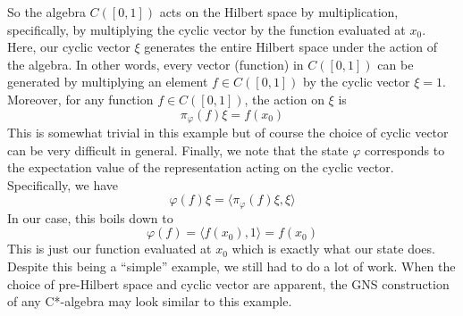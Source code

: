 \begin{example}
\begin{equation}
\end{equation}
So the algebra $C([0,1])$ acts on the Hilbert space by multiplication, specifically,
by multiplying the cyclic vector by the function evaluated at $x_0$. Here, our cyclic
vector $\xi$ generates the entire Hilbert space under the action of the algebra.
In other words, every vector (function) in $C([0,1])$ can be generated by multiplying
an element $f \in C([0,1])$ by the cyclic vector $\xi = 1$. Moreover, for
any function $f \in C([0,1])$, the action on $\xi$ is
\begin{equation}
    \pi_\varphi(f)\xi = f(x_0)
\end{equation}
This is somewhat trivial in this example but of course the choice of cyclic vector
can be very difficult in general. Finally, we note that the state  $\varphi$ corresponds
 to the expectation value of the representation acting on the cyclic vector.
Specifically, we have
\begin{equation}
    \varphi(f)\xi = \langle \pi_\varphi (f) \xi, \xi \rangle
\end{equation}
In our case, this boils down to
\begin{equation}
    \varphi(f) = \langle f(x_0), 1 \rangle = f(x_0)
\end{equation}
This is just our function evaluated at $x_0$ which is exactly what our state does.
Despite this being a ``simple'' example, we still had to do a lot of work. When
the choice of pre-Hilbert space and cyclic vector are apparent, the GNS construction
of any C*-algebra may look similar to this example.
\end{example}


